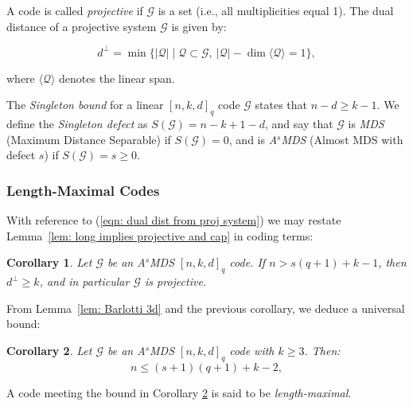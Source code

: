 \documentclass[letterpaper, 12pt]{article}
\newtheorem{corollary}{Corollary}
\newcommand{\G}{\mathcal{G}}
\begin{document}
A code is called \emph{projective} if \( \G \) is a set (i.e., all multiplicities equal 1).
The dual distance of a projective system \( \G \) is given by:

\begin{equation}\label{eqn: dual dist from proj system}
	d^\perp = \min \{ |\mathcal{Q}| \mid \mathcal{Q} \subset \G,~ |\mathcal{Q}| - \dim \langle \mathcal{Q} \rangle = 1 \},
\end{equation}

where \( \langle \mathcal{Q} \rangle \) denotes the linear span.


The \emph{Singleton bound} for a linear \([n, k, d]_q\) code $\G$ states that
$n - d \ge k - 1$.
We define the \emph{Singleton defect} as \( S(\G) = n - k + 1 - d \), and say that \( \G \) is  \emph{MDS} (Maximum Distance Separable) if \( S(\G) = 0 \), and is \emph{A$^s$MDS} (Almost MDS with defect $s$) if \( S(\G) = s\ge 0 \).

\subsubsection*{Length-Maximal Codes}

With reference to (\ref{eqn: dual dist from proj system}) we may restate Lemma~\ref{lem: long implies projective and cap} in coding terms:

\begin{corollary}\label{cor: long is projective}
	Let \( \G \) be an A$^s$MDS \([n, k, d]_q\) code. If \( n > s(q+1) + k - 1 \), then \( d^\perp \ge k \), and in particular \( \G \) is projective.
\end{corollary}

From Lemma~\ref{lem: Barlotti 3d} and the previous corollary, we deduce a universal bound:

\begin{corollary}\label{cor: length-maximal bound}
	Let \( \G \) be an A$^s$MDS \([n, k, d]_q\) code with \( k \ge 3 \). Then:
	\[
	n \le (s+1)(q+1) + k - 2,
	\]
\end{corollary}

A code meeting the bound in Corollary \ref{cor: length-maximal bound} is said to be  \textit{length-maximal}.
\end{document}
